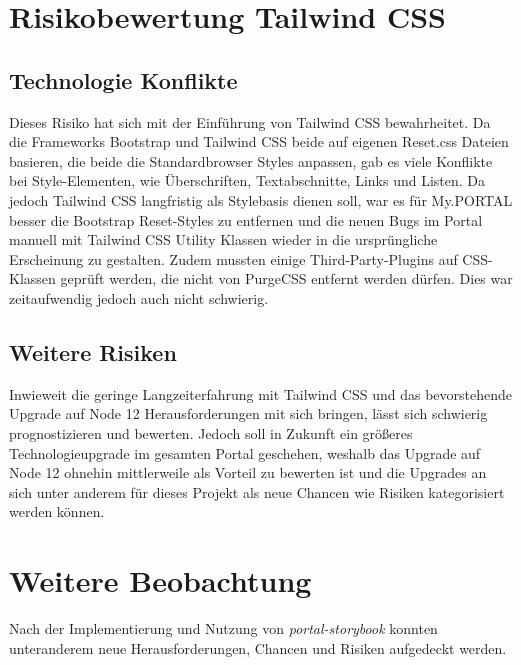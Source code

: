 \section{Risikobewertung Tailwind CSS}
\subsection{Technologie Konflikte}
Dieses Risiko hat sich mit der Einführung von Tailwind CSS bewahrheitet. Da die Frameworks Bootstrap und Tailwind CSS beide auf eigenen Reset.css Dateien basieren, die beide die Standardbrowser Styles anpassen, gab es viele Konflikte bei Style-Elementen, wie Überschriften, Textabschnitte, Links und Listen. Da jedoch Tailwind CSS langfristig als Stylebasis dienen soll, war es für My.PORTAL besser die Bootstrap Reset-Styles zu entfernen und die neuen Bugs im Portal manuell mit Tailwind CSS Utility Klassen wieder in die ursprüngliche Erscheinung zu gestalten. Zudem mussten einige Third-Party-Plugins auf CSS-Klassen geprüft werden, die nicht von PurgeCSS entfernt werden dürfen. Dies war zeitaufwendig jedoch auch nicht schwierig.

\subsection{Weitere Risiken}
Inwieweit die geringe Langzeiterfahrung mit Tailwind CSS und das bevorstehende Upgrade auf Node 12 Herausforderungen mit sich bringen, lässt sich schwierig prognostizieren und bewerten. Jedoch soll in Zukunft ein größeres Technologieupgrade im gesamten Portal geschehen, weshalb das Upgrade auf Node 12 ohnehin mittlerweile als Vorteil zu bewerten ist und die Upgrades an sich unter anderem für dieses Projekt als neue Chancen wie Risiken kategorisiert werden können.

\section{Weitere Beobachtung}
Nach der Implementierung und Nutzung von \textit{portal-storybook} konnten unteranderem neue Herausforderungen, Chancen und Risiken aufgedeckt werden.
